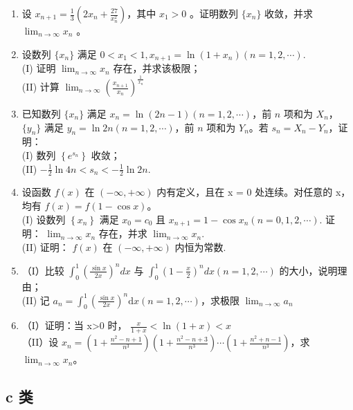 \documentclass[12pt, a4paper]{ctexart}
\begin{document}
\begin{enumerate}[start=31]
    \item 设 $ x_{n+1}=\frac{1}{3}\left(2x_{n}+\frac{27}{x_{n}^{2}}\right) $，其中 $ x_{1}>0 $ 。证明数列 $ \{x_{n}\} $ 收敛，并求 $ \lim_{n\to\infty}x_{n} $ 。

    \item 设数列 $ \{x_{n}\} $ 满足 $ 0 < x_{1} < 1, x_{n+1} = \ln(1 + x_{n}) (n = 1, 2, \cdots) $.\\
    (I) 证明 $ \lim_{n\to\infty}x_n $ 存在，并求该极限；\\
    (II) 计算 $ \lim_{n\to\infty}\left(\frac{x_{n+1}}{x_n}\right)^{\frac{1}{x_n}} $

    \item 已知数列 $ \{x_n\} $ 满足 $ x_n = \ln(2n-1)(n=1,2,\cdots) $，前 $ n $ 项和为 $ X_n $， $ \{y_n\} $ 满足 $ y_n = \ln 2n(n=1,2,\cdots) $，前 $ n $ 项和为 $ Y_n $。若 $ s_n = X_n - Y_n $，证明：\\
    (I) 数列 $ \left\{e^{s_{n}}\right\} $ 收敛；\\
    (II) $ -\frac{1}{2}\ln4n < s_n < -\frac{1}{2}\ln2n $.

    \item 设函数 $ f(x) $ 在 $ (-\infty, +\infty) $ 内有定义，且在 x = 0 处连续。对任意的 x，均有 $ f(x) = f(1 - \cos x) $。\\
    (I) 设数列 $ \left\{x_{n}\right\} $ 满足 $ x_{0}=c_{0} $ 且 $ x_{n+1}=1-\cos x_{n}(n=0,1,2,\cdots) $. 证明： $ \lim_{n\to\infty}x_n $ 存在，并求 $ \lim_{n\to\infty}x_n $.\\
    (II) 证明： $ f(x) $ 在 $ (-\infty, +\infty) $ 内恒为常数.

    \item （I）比较 $ \int_{0}^{1}\left(\frac{\sin x}{2x}\right)^{n}dx $ 与 $ \int_{0}^{1}\left(1-\frac{x}{2}\right)^{n}dx\left(n=1,2,\cdots\right) $ 的大小，说明理由；\\
    (II) 记 $ a_{n}=\int_{0}^{1}\left(\frac{\sin x}{2x}\right)^{n}\mathrm{d}x\left(n=1,2,\cdots\right) $，求极限 $ \lim_{n\to\infty}a_{n} $

    \item （I）证明：当 x>0 时， $ \frac{x}{1+x}<\ln(1+x)<x $\\
    （II）设 $ x_{n}=\left(1+\frac{n^{2}-n+1}{n^{3}}\right)\left(1+\frac{n^{2}-n+3}{n^{3}}\right)\cdots\left(1+\frac{n^{2}+n-1}{n^{3}}\right) $，求 $ \lim_{n\to\infty}x_n $。
\end{enumerate}

\subsection{c 类}
\end{document}
